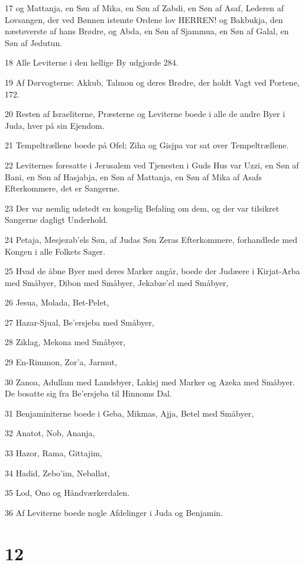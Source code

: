\par 17 og Mattanja, en Søn af Mika, en Søn af Zabdi, en Søn af Asaf, Lederen af Lovsangen, der ved Bønnen istemte Ordene lov HERREN! og Bakbukja, den næstøverste af hans Brødre, og Abda, en Søn af Sjammua, en Søn af Galal, en Søn af Jedutun.
\par 18 Alle Leviterne i den hellige By udgjorde 284.
\par 19 Af Dørvogterne: Akkub, Talmon og deres Brødre, der holdt Vagt ved Portene, 172.
\par 20 Resten af Israeliterne, Præsterne og Leviterne boede i alle de andre Byer i Juda, hver på sin Ejendom.
\par 21 Tempeltrællene boede på Ofel; Ziha og Gisjpa var sat over Tempeltrællene.
\par 22 Leviternes foresatte i Jerusalem ved Tjenesten i Guds Hus var Uzzi, en Søn af Bani, en Søn af Hasjabja, en Søn af Mattanja, en Søn af Mika af Asafs Efterkommere, det er Sangerne.
\par 23 Der var nemlig udstedt en kongelig Befaling om dem, og der var tilsikret Sangerne dagligt Underhold.
\par 24 Petaja, Mesjezab'els Søn, af Judas Søn Zeras Efterkommere, forhandlede med Kongen i alle Folkets Sager.
\par 25 Hvad de åbne Byer med deres Marker angår, boede der Judæere i Kirjat-Arba med Småbyer, Dibon med Småbyer, Jekabze'el med Småbyer,
\par 26 Jesua, Molada, Bet-Pelet,
\par 27 Hazar-Sjual, Be'ersjeba med Småbyer,
\par 28 Ziklag, Mekona med Småbyer,
\par 29 En-Rimmon, Zor'a, Jarmut,
\par 30 Zanoa, Adullam med Landsbyer, Lakisj med Marker og Azeka med Småbyer. De bosatte sig fra Be'ersjeba til Hinnoms Dal.
\par 31 Benjaminiterne boede i Geba, Mikmas, Ajja, Betel med Småbyer,
\par 32 Anatot, Nob, Ananja,
\par 33 Hazor, Rama, Gittajim,
\par 34 Hadid, Zebo'im, Neballat,
\par 35 Lod, Ono og Håndværkerdalen.
\par 36 Af Leviterne boede nogle Afdelinger i Juda og Benjamin.

\chapter{12}

